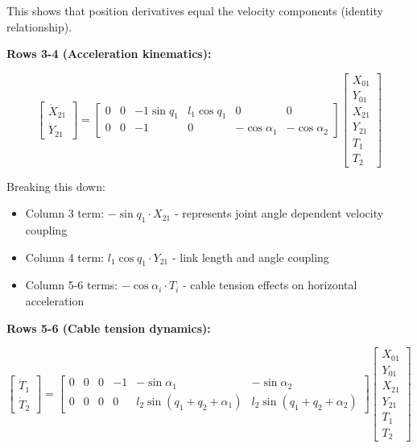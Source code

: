 This shows that position derivatives equal the velocity components (identity relationship).

\textbf{Rows 3-4 (Acceleration kinematics):}

\begin{equation}
\begin{bmatrix}
\dot{X}_{21} \\
\dot{Y}_{21}
\end{bmatrix} = \begin{bmatrix}
0 & 0 & -1 \sin q_1 & l_1 \cos q_1 & 0 & 0 \\
0 & 0 & -1 & 0 & -\cos \alpha_1 & -\cos \alpha_2
\end{bmatrix} \begin{bmatrix}
X_{01} \\
Y_{01} \\
X_{21} \\
Y_{21} \\
T_1 \\
T_2
\end{bmatrix}
\end{equation}

Breaking this down:
\begin{itemize}
    \item Column 3 term: $-\sin q_1 \cdot X_{21}$ - represents joint angle dependent velocity coupling
    \item Column 4 term: $l_1 \cos q_1 \cdot Y_{21}$ - link length and angle coupling
    \item Column 5-6 terms: $-\cos \alpha_i \cdot T_i$ - cable tension effects on horizontal acceleration
\end{itemize}

\textbf{Rows 5-6 (Cable tension dynamics):}

\begin{equation}
\begin{bmatrix}
\dot{T}_1 \\
\dot{T}_2
\end{bmatrix} = \begin{bmatrix}
0 & 0 & 0 & -1 & -\sin \alpha_1 & -\sin \alpha_2 \\
0 & 0 & 0 & 0 & l_2 \sin(q_1+q_2+\alpha_1) & l_2 \sin(q_1+q_2+\alpha_2)
\end{bmatrix} \begin{bmatrix}
X_{01} \\
Y_{01} \\
X_{21} \\
Y_{21} \\
T_1 \\
T_2
\end{bmatrix}
\end{equation}

